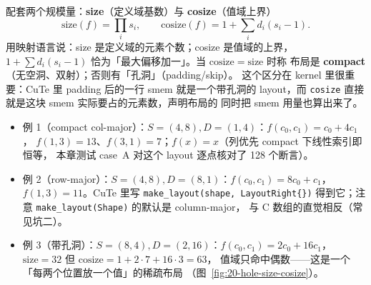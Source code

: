 配套两个规模量：\textbf{size}（定义域基数）与 \textbf{cosize}（值域上界）
\begin{equation}
  \mathrm{size}(f) = \prod_i s_i , \qquad
  \mathrm{cosize}(f) = 1 + \sum_i d_i (s_i - 1) .
  \label{eq:20-size-cosize}
\end{equation}
用映射语言说：size 是定义域的元素个数；cosize 是值域的上界，$1+\sum
d_i(s_i-1)$ 恰为「最大偏移加一」。当 $\mathrm{cosize}=\mathrm{size}$ 时称
布局是 \textbf{compact}（无空洞、双射）；否则有「孔洞」（padding/skip）。
这个区分在 kernel 里很重要：CuTe 里 padding 后的一行 smem 就是一个带孔洞的
layout，而 \texttt{cosize} 直接就是这块 smem 实际要占的元素数，声明布局的
同时把 smem 用量也算出来了。

\begin{itemize}
  \item 例 1（compact col-major）：$S=(4,8),D=(1,4)$：$f(c_0,c_1)=c_0+4c_1$，
        $f(1,3)=13$、$f(3,1)=7$；$f(x)=x$（列优先 compact 下线性索引即恒等，
        本章测试 case~A 对这个 layout 逐点核对了 128 个断言）。
  \item 例 2（row-major）：$S=(4,8),D=(8,1)$：$f(c_0,c_1)=8c_0+c_1$，
        $f(1,3)=11$。CuTe 里写 \texttt{make\_\allowbreak{}layout\allowbreak{}(shape,\allowbreak{} Layout\allowbreak{}Right\{\})}
        得到它；注意 \texttt{make\_\allowbreak{}layout\allowbreak{}(Shape)} 的默认是 column-major，
        与 C 数组的直觉相反（常见坑二）。
  \item 例 3（带孔洞）：$S=(8,4),D=(2,16)$：$f(c_0,c_1)=2c_0+16c_1$，
        $\mathrm{size}=32$ 但 $\mathrm{cosize}=1+2\cdot7+16\cdot3=63$，
        值域只命中偶数——这是一个「每两个位置放一个值」的稀疏布局
        （图~\ref{fig:20-hole-size-cosize}）。
\end{itemize}

